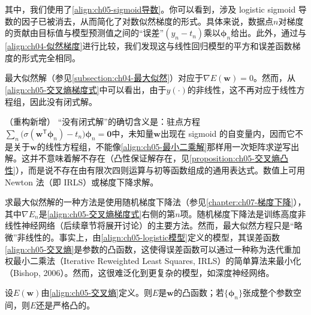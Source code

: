 \documentclass[../../main.tex]{subfiles}
\begin{document}
其中，我们使用了\eqref{align:ch05-sigmoid导数}。你可以看到，涉及 logistic sigmoid 导数的因子已被消去，从而简化了对数似然梯度的形式。具体来说，数据点$n$对梯度的贡献由目标值与模型预测值之间的“误差”$(y_n-t_n)$乘以$\boldsymbol{\phi}_n$给出。此外，通过与\cref{align:ch04-似然梯度}进行比较，我们发现这与线性回归模型的平方和误差函数梯度的形式完全相同。

最大似然解（参见\cref{subsection:ch04-最大似然}）对应于$\nabla E(\boldsymbol{w})=0$。然而，从\eqref{align:ch05-交叉熵梯度式}中可以看出，由于$y(\cdot)$的非线性，这不再对应于线性方程组，因此没有闭式解。

\begin{remark}（重构新增）
“没有闭式解”的确切含义是：驻点方程$\sum_n\bigl(\sigma(\boldsymbol{w}^{\mathsf{T}}\boldsymbol{\phi}_n)-t_n\bigr)\boldsymbol{\phi}_n=\boldsymbol{0}$中，未知量$\boldsymbol{w}$出现在 sigmoid 的自变量内，因而它不是关于$\boldsymbol{w}$的线性方程组，不能像\eqref{align:ch05-最小二乘解}那样用一次矩阵求逆写出解。这并不意味着解不存在（凸性保证解存在，见\cref{proposition:ch05-交叉熵凸性}），而是说不存在由有限次四则运算与初等函数组成的通用表达式。数值上可用 Newton 法（即 IRLS）或梯度下降求解。
\end{remark}

求最大似然解的一种方法是使用随机梯度下降法（参见\cref{chapter:ch07-梯度下降}），其中$\nabla E_n$是\eqref{align:ch05-交叉熵梯度式}右侧的第$n$项。随机梯度下降法是训练高度非线性神经网络（后续章节将展开讨论）的主要方法。然而，最大似然方程只是“略微”非线性的。事实上，由\eqref{align:ch05-logistic模型}定义的模型，其误差函数\eqref{align:ch05-交叉熵}是参数的凸函数，这使得误差函数可以通过一种称为迭代重加权最小二乘法（Iterative Reweighted Least Squares, IRLS）的简单算法来最小化（Bishop, 2006）。然而，这很难泛化到更复杂的模型，如深度神经网络。

\begin{proposition}[交叉熵误差的凸性]\label{proposition:ch05-交叉熵凸性}
设$E(\boldsymbol{w})$由\eqref{align:ch05-交叉熵}定义。则$E$是$\boldsymbol{w}$的凸函数；若$\{\boldsymbol{\phi}_n\}$张成整个参数空间，则$E$还是严格凸的。
\end{proposition}
\end{document}
